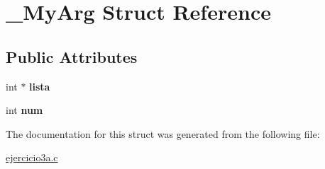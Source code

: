 \hypertarget{struct__MyArg}{}\section{\+\_\+\+My\+Arg Struct Reference}
\label{struct__MyArg}
\subsection*{Public Attributes}
\begin{DoxyCompactItemize}
\item 
int $\ast$ {\bfseries lista}\hypertarget{struct__MyArg_ad5e7027043c772309080505ca4e5f1cf}{}\label{struct__MyArg_ad5e7027043c772309080505ca4e5f1cf}

\item 
int {\bfseries num}\hypertarget{struct__MyArg_ad16a06b11968bb77c9d0524edb715312}{}\label{struct__MyArg_ad16a06b11968bb77c9d0524edb715312}

\end{DoxyCompactItemize}


The documentation for this struct was generated from the following file\+:\begin{DoxyCompactItemize}
\item 
\hyperlink{ejercicio3a_8c}{ejercicio3a.\+c}\end{DoxyCompactItemize}
